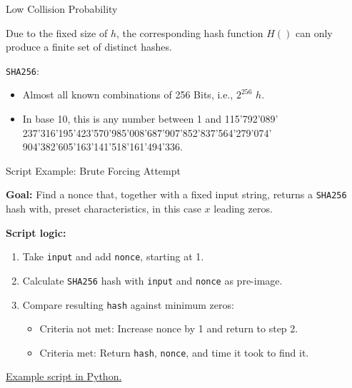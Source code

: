 \documentclass[]{beamer}
\begin{document}
\begin{frame}{Low Collision Probability}

Due to the fixed size of $h$, the corresponding hash function $H()$ can only produce a finite set of distinct hashes.
\vspace{1em}

\texttt{SHA256}:
	\begin{itemize}
		\item Almost all known combinations of 256 Bits, i.e.,  $2^{256}$ $h$.
		\item In base 10, this is any number between 1 and 115'792'089' 237'316'195'423'570'985'008'687'907’852'837'564'279'074' 904'382'605'163'141'518'161'494'336.
	\end{itemize}
\vspace{1em}


	
\end{frame}

\begin{frame}{Script Example: Brute Forcing Attempt}

\textbf{Goal:} Find a nonce that, together with a fixed input string, returns a \texttt{SHA256} hash with, preset characteristics, in this case $x$ leading zeros.

\vspace{1em}

\textbf{Script logic:}
\begin{enumerate}
	\item Take \texttt{input} and add \texttt{nonce}, starting at 1.
	\item Calculate \texttt{SHA256} hash with \texttt{input} and \texttt{nonce} as pre-image.
	\item Compare resulting \texttt{hash} against minimum zeros:
	\begin{itemize}
		\item Criteria not met: Increase nonce by 1 and  return to step 2.
		\item Criteria met: Return \texttt{hash}, \texttt{nonce}, and time it took to find it.
	\end{itemize} 
\end{enumerate}

\vspace{1em}

\color{focus} \link \href {https://github.com/cifunibas/Bitcoin-Blockchain-Cryptoassets/blob/main/assets/scripts/miner.py}{Example script in Python.}
	
\end{frame}
\end{document}
